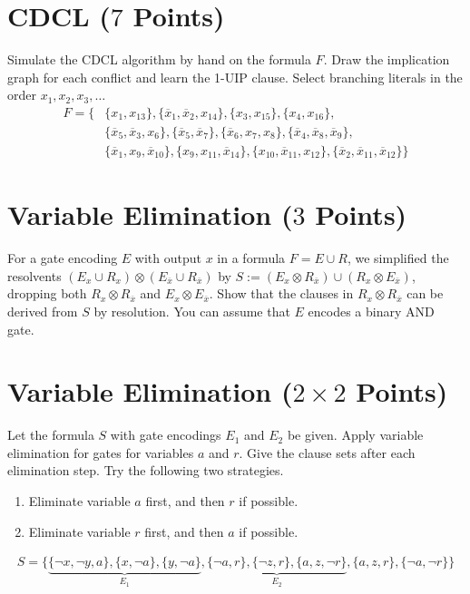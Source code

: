 \documentclass{article}
\begin{document}
\vspace*{-1em}

\section{CDCL ($7$ Points)}
Simulate the CDCL algorithm by hand on the formula $F$.
Draw the implication graph for each conflict and learn the 1-UIP clause.
Select branching literals in the order $x_1, x_2, x_3, \dots$
\vspace*{-1ex}
\begin{align*}
F = \bigl\{ &\{ x_1, x_{13} \}, \{ \overline x_1, \overline x_2, x_{14} \}, \{ x_3, x_{15} \}, \{ x_4, x_{16} \}, \\
            &\{ \overline x_5, \overline x_3, x_6 \}, \{ \overline x_5, \overline x_7 \}, \{ \overline x_6, x_7, x_8 \}, \{ \overline x_4, \overline x_8, \overline x_9 \}, \\
            &\{ \overline x_1, x_9, \overline x_{10} \}, \{ x_9, x_{11}, \overline x_{14} \}, \{ x_{10}, \overline x_{11}, x_{12} \}, \{ \overline x_2, \overline x_{11}, \overline x_{12} \} \bigr\}
\end{align*}

\section{Variable Elimination ($3$ Points)}
For a gate encoding $E$ with output $x$ in a formula $F = E \cup R$,
we simplified the resolvents $(E_x \cup R_x) \otimes (E_{\overline x} \cup R_{\overline x})$ by
$S := (E_x \otimes R_{\overline x}) \cup (R_x \otimes E_{\overline x})$, dropping both
$R_x \otimes R_{\overline x}$ and $E_x \otimes E_{\overline x}$.
Show that the clauses in $R_x \otimes R_{\overline x}$ can be derived from $S$ by resolution.
You can assume that $E$ encodes a binary AND gate.

\section{Variable Elimination ($2 \times 2$ Points)}
Let the formula $S$ with gate encodings $E_1$ and $E_2$ be given.
Apply variable elimination for gates for variables $a$ and $r$.
Give the clause sets after each elimination step.
Try the following two strategies.
\vspace*{-1ex}
\begin{enumerate}\setlength{\itemsep}{0pt}
\item Eliminate variable $a$ first, and then $r$ if possible.
\item Eliminate variable $r$ first, and then $a$ if possible.
\end{enumerate}
\vspace*{-1ex}
\begin{align*}
S = \bigl\{ \underbrace{\{ \lnot x, \lnot y, a \}, \{ x, \lnot a \}, \{ y, \lnot a \}}_{E_1},
\underbrace{\{ \lnot a, r \}, \{ \lnot z, r \}, \{ a, z, \lnot r \}}_{E_2}, \{ a, z, r \},
\{ \lnot a, \lnot r \} \bigr\}
\end{align*}
\end{document}
